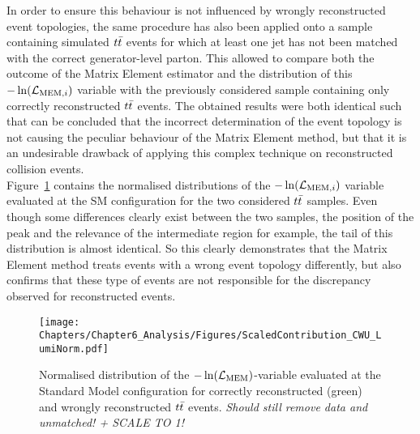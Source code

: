 In order to ensure this behaviour is not influenced by wrongly reconstructed event topologies, the same procedure has also been applied onto a sample containing simulated $t\bar{t}$ events for which at least one jet has not been matched with the correct generator-level parton.
This allowed to compare both the outcome of the Matrix Element estimator and the distribution of this $-\ln(\mathcal{L}_{\textrm{MEM}, i})$ variable with the previously considered sample containing only correctly reconstructed $t\bar{t}$ events.
The obtained results were both identical such that can be concluded that the incorrect determination of the event topology is not causing the peculiar behaviour of the Matrix Element method, but that it is an undesirable drawback of applying this complex technique on reconstructed collision events.
\\
Figure~\ref{fig::SMLikCorrVSWr} contains the normalised distributions of the $-\ln(\mathcal{L}_{\textrm{MEM}, i})$ variable evaluated at the SM configuration for the two considered $t\bar{t}$ samples.
Even though some differences clearly exist between the two samples, the position of the peak and the relevance of the intermediate region for example, the tail of this distribution is almost identical.
So this clearly demonstrates that the Matrix Element method treats events with a wrong event topology differently, but also confirms that these type of events are not responsible for the discrepancy observed for reconstructed events.
\\
\begin{figure}[h!t]
 \centering
 \texttt{[image: Chapters/Chapter6\_Analysis/Figures/ScaledContribution\_CWU\_LumiNorm.pdf]}
 \caption{Normalised distribution of the $-\ln(\mathcal{L}_{\textrm{MEM}})$-variable evaluated at the Standard Model configuration for correctly reconstructed (green) and wrongly reconstructed $t\bar{t}$ events. \textit{Should still remove data and unmatched! + SCALE TO 1!}} \label{fig::SMLikCorrVSWr}
\end{figure}


